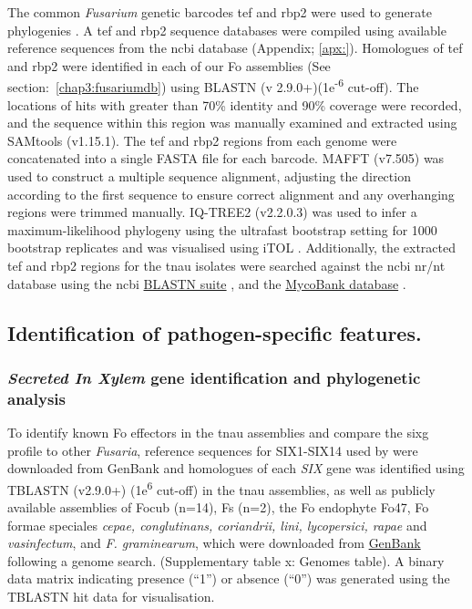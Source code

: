 The common \textit{Fusarium} genetic barcodes \ac{tef} and \ac{rbp2} were used to generate phylogenies \parencite{Edel-Hermann2019}. A \ac{tef} and \ac{rbp2} sequence databases were compiled using available reference sequences from the \ac{ncbi} database (Appendix; \ref{apx:}). Homologues of \ac{tef} and \ac{rbp2} were identified in each of our \ac{Fo} assemblies (See section:~\ref{chap3:fusariumdb}) using BLASTN (v 2.9.0+)(1e\textsuperscript{-6} cut-off). The locations of hits with greater than 70\% identity and 90\% coverage were recorded, and the sequence within this region was manually examined and extracted using SAMtools (v1.15.1). The \ac{tef} and \ac{rbp2} regions from each genome were concatenated into a single FASTA file for each barcode. MAFFT (v7.505) \parencite{Katoh2019} was used to construct a multiple sequence alignment, adjusting the direction according to the first sequence to ensure correct alignment and any overhanging regions were trimmed manually. IQ-TREE2 (v2.2.0.3) \parencite{Nguyen2015} was used to infer a maximum-likelihood phylogeny using the ultrafast bootstrap setting for 1000 bootstrap replicates and was visualised using iTOL \parencite{Letunic2021}. Additionally, the extracted \ac{tef} and \ac{rbp2} regions for the \ac{tnau} isolates were searched against the \ac{ncbi} nr/nt database using the  \ac{ncbi} \href{https://blast.ncbi.nlm.nih.gov/Blast.cgi?PROGRAM=blastn&BLAST_SPEC=GeoBlast&PAGE_TYPE=BlastSearch}{BLASTN suite} \parencite{Nih2014}, and the \href{https://fusarium.mycobank.org/page/Fusarium_table}{MycoBank database} \parencite{Robert2013}. 

\subsection{Identification of pathogen-specific features.}

\subsubsection{\textit{Secreted In Xylem} gene identification and phylogenetic analysis}
\label{chap1:tnauSIXgenePhylo}
To identify known \acs{Fo} effectors in the \ac{tnau} assemblies and compare the \ac{sixg} profile to other \textit{Fusaria}, reference sequences for SIX1-SIX14 used by \textcite{Czislowski2018} were downloaded from  GenBank and homologues of each \textit{SIX} gene was identified using TBLASTN (v2.9.0+) (1e\textsuperscript{6} cut-off) in the \ac{tnau} assemblies, as well as publicly available assemblies of \ac{Focub} (n=14), \ac{Fs} (n=2), the \ac{Fo} endophyte Fo47, \ac{Fo} formae speciales \textit{cepae, conglutinans, coriandrii, lini, lycopersici,  rapae} and \textit{vasinfectum}, and \textit{F. graminearum}, which were downloaded from \href{https://www.ncbi.nlm.nih.gov/data-hub/genome/}{GenBank} following a genome search. (Supplementary table x: Genomes table). A binary data matrix indicating presence (“1”) or absence (“0”) was generated using the TBLASTN hit data for visualisation. 

